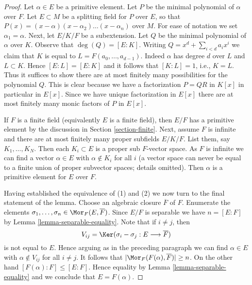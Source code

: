 \begin{proof}
Let $\alpha \in E$ be a primitive element. Let $P$ be the minimal
polynomial of $\alpha$ over $F$. Let $E \subset M$ be a splitting
field for $P$ over $E$, so that
$P(x) = (x - \alpha)(x - \alpha_2) \ldots (x - \alpha_n)$ over $M$.
For ease of notation we set $\alpha_1 = \alpha$.
Next, let $E/K/F$ be a subextension. Let $Q$ be the minimal
polynomial of $\alpha$ over $K$. Observe that $\deg(Q) = [E : K]$.
Writing $Q = x^d + \sum_{i < d} a_i x^i$ we claim that
$K$ is equal to $L = F(a_0, \ldots, a_{d - 1})$. Indeed $\alpha$ has degree
$d$ over $L$ and $L \subset K$. Hence $[E : L] = [E : K]$ and it follows
that $[K : L] = 1$, i.e., $K = L$.
Thus it suffices to show there are at most finitely many possibilities
for the polynomial $Q$. This is clear because we have a factorization
$P = QR$  in $K[x]$ in particular in $E[x]$. Since we have unique
factorization in $E[x]$ there are at most finitely many monic
factors of $P$ in $E[x]$.

\medskip\noindent
If $F$ is a finite field (equivalently $E$ is a finite field), then
$E/F$ has a primitive element by the discussion in
Section \ref{section-finite}.
Next, assume $F$ is infinite and there are at most finitely many proper
subfields $E/K/F$. List them, say $K_1, \ldots, K_N$. Then
each $K_i \subset E$ is a proper sub $F$-vector space. As $F$ is infinite
we can find a vector $\alpha \in E$ with $\alpha \not \in K_i$ for all $i$
(a vector space can never be equal to a finite union of proper subvector spaces;
details omitted). Then $\alpha$ is a primitive element for $E$ over $F$.

\medskip\noindent
Having established the equivalence of (1) and (2) we now turn to
the final statement of the lemma. Choose an algebraic closure
$\overline{F}$ of $F$. Enumerate the elements
$\sigma_1, \ldots, \sigma_n \in \Mor_F(E, \overline{F})$.
Since $E/F$ is separable we have $n = [E : F]$ by
Lemma \ref{lemma-separable-equality}.
Note that if $i \not = j$, then
$$
V_{ij} = \Ker(\sigma_i - \sigma_j : E \longrightarrow \overline{F})
$$
is not equal to $E$. Hence arguing as in the preceding paragraph
we can find $\alpha \in E$ with $\alpha \not \in V_{ij}$ for all
$i \not = j$. It follows that $|\Mor_F(F(\alpha), \overline{F})| \geq n$.
On the other hand $[F(\alpha) : F] \leq [E : F]$. Hence equality
by Lemma \ref{lemma-separable-equality}
and we conclude that $E = F(\alpha)$.
\end{proof}






